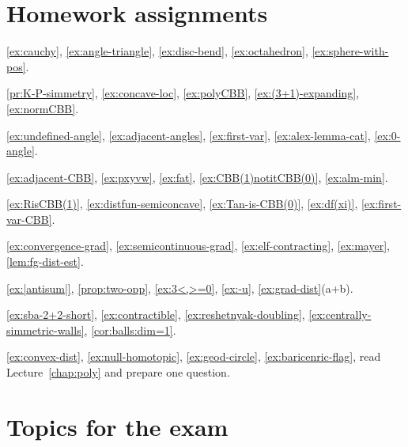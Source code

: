 \chapter*{Homework assignments}

\ref{ex:cauchy},
\ref{ex:angle-triangle},
\ref{ex:disc-bend},
\ref{ex:octahedron},
\ref{ex:sphere-with-pos}.

\ref{pr:K-P-simmetry},
\ref{ex:concave-loc},
\ref{ex:polyCBB},
\ref{ex:(3+1)-expanding},
\ref{ex:normCBB}.

\ref{ex:undefined-angle},
\ref{ex:adjacent-angles},
\ref{ex:first-var},
\ref{ex:alex-lemma-cat},
\ref{ex:0-angle}.

\ref{ex:adjacent-CBB},
\ref{ex:pxyvw},
\ref{ex:fat},
\ref{ex:CBB(1)notitCBB(0)},
\ref{ex:alm-min}.

\ref{ex:RisCBB(1)},
\ref{ex:distfun-semiconcave},
\ref{ex:Tan-is-CBB(0)},
\ref{ex:df(xi)},
\ref{ex:first-var-CBB}.

\ref{ex:convergence-grad},
\ref{ex:semicontinuous-grad},
\ref{ex:elf-contracting},
\ref{ex:mayer},
\ref{lem:fg-dist-est}.

\ref{ex:|antisum|},
\ref{prop:two-opp},
\ref{ex:3<,>=0},
\ref{ex:-u},
\ref{ex:grad-dist}(a+b).

\ref{ex:sba-2+2-short},
\ref{ex:contractible},
\ref{ex:reshetnyak-doubling},
\ref{ex:centrally-simmetric-walls},
\ref{cor:balls:dim=1}.

\ref{ex:convex-dist},
\ref{ex:null-homotopic},
\ref{ex:geod-circle},
\ref{ex:baricenric-flag},
read Lecture~\ref{chap:poly} and prepare one question.

\chapter*{Topics for the exam}

